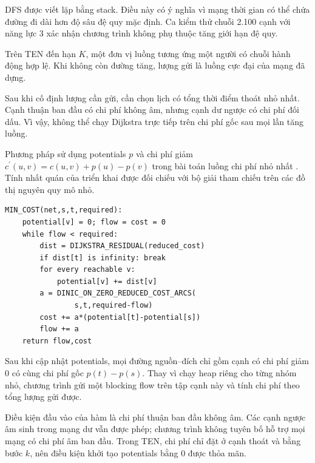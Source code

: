 DFS được viết lặp bằng stack. Điều này có ý nghĩa vì mạng thời gian có thể chứa đường đi dài hơn độ sâu đệ quy mặc định. Ca kiểm thử chuỗi 2.100 cạnh với năng lực 3 xác nhận chương trình không phụ thuộc tăng giới hạn đệ quy.

Trên TEN đến hạn $K$, một đơn vị luồng tương ứng một người có chuỗi hành động hợp lệ. Khi không còn đường tăng, lượng gửi là luồng cực đại của mạng đã dựng.

Sau khi cố định lượng cần gửi, cần chọn lịch có tổng thời điểm thoát nhỏ nhất. Cạnh thuận ban đầu có chi phí không âm, nhưng cạnh dư ngược có chi phí đối dấu. Vì vậy, không thể chạy Dijkstra trực tiếp trên chi phí gốc sau mọi lần tăng luồng.

Phương pháp sử dụng potentials $p$ và chi phí giảm $c^{\prime}(u,v)=c(u,v)+p(u)-p(v)$ trong bài toán luồng chi phí nhỏ nhất \cite{mitflow}. Tính nhất quán của triển khai được đối chiếu với bộ giải tham chiếu trên các đồ thị nguyên quy mô nhỏ.
\begin{algorithm}[htbp]\caption{Luồng chi phí nhỏ nhất với potentials và luồng chặn}\label{alg:4}
\begin{lstlisting}[frame=none]
MIN_COST(net,s,t,required):
    potential[v] = 0; flow = cost = 0
    while flow < required:
        dist = DIJKSTRA_RESIDUAL(reduced_cost)
        if dist[t] is infinity: break
        for every reachable v:
            potential[v] += dist[v]
        a = DINIC_ON_ZERO_REDUCED_COST_ARCS(
                s,t,required-flow)
        cost += a*(potential[t]-potential[s])
        flow += a
    return flow,cost
\end{lstlisting}
\end{algorithm}
Sau khi cập nhật potentials, mọi đường nguồn--đích chỉ gồm cạnh có chi phí giảm 0 có cùng chi phí gốc $p(t)-p(s)$. Thay vì chạy heap riêng cho từng nhóm nhỏ, chương trình gửi một blocking flow trên tập cạnh này và tính chi phí theo tổng lượng gửi được.

Điều kiện đầu vào của hàm là chi phí thuận ban đầu không âm. Các cạnh ngược âm sinh trong mạng dư vẫn được phép; chương trình không tuyên bố hỗ trợ mọi mạng có chi phí âm ban đầu. Trong TEN, chi phí chỉ đặt ở cạnh thoát và bằng bước $k$, nên điều kiện khởi tạo potentials bằng 0 được thỏa mãn.

